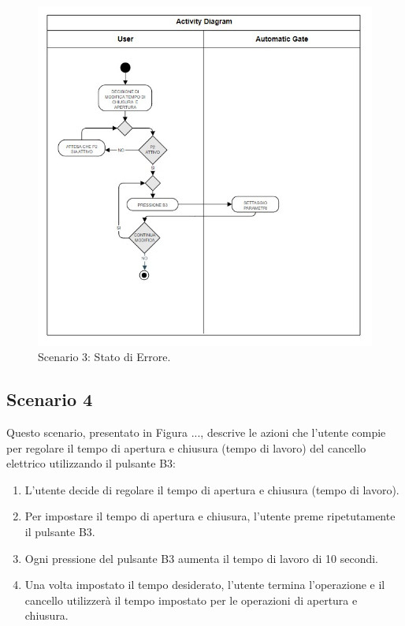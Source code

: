 \documentclass[12pt]{article}
\begin{document}
\begin{figure}[h]
    \centering
    \includegraphics[width = 0.7 \textwidth]{Scenario_3.jpg}
    \caption{Scenario 3: Stato di Errore.}
    
\end{figure}


\subsection{Scenario 4}
Questo scenario, presentato in Figura ..., descrive le azioni che l’utente compie per regolare il tempo di apertura e chiusura (tempo di lavoro) del cancello elettrico utilizzando il pulsante B3:

\begin{enumerate}
    \item L’utente decide di regolare il tempo di apertura e chiusura (tempo di lavoro).
    \item Per impostare il tempo di apertura e chiusura, l’utente preme ripetutamente il pulsante B3.
    \item Ogni pressione del pulsante B3 aumenta il tempo di lavoro di 10 secondi.
    \item Una volta impostato il tempo desiderato, l’utente termina l’operazione e il cancello utilizzerà il tempo impostato per le operazioni di apertura e chiusura.
\end{enumerate}
\end{document}
